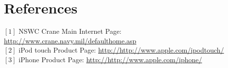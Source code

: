 \section{References}%
$[1]$ NSWC Crane Main Internet Page: \url{http://www.crane.navy.mil/defaulthome.asp}\\
$[2]$ iPod touch Product Page: \url{http://http://www.apple.com/ipodtouch/}\\
$[3]$ iPhone Product Page: \url{http://http://www.apple.com/iphone/}\\